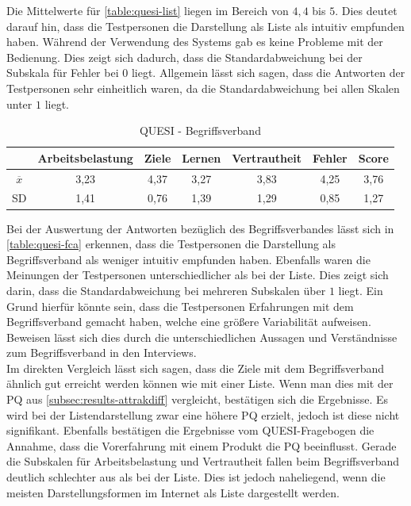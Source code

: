 Die Mittelwerte für \autoref{table:quesi-list} liegen im Bereich von $4,4$ bis $5$.
Dies deutet darauf hin, dass die Testpersonen die Darstellung als Liste als intuitiv empfunden haben.
Während der Verwendung des Systems gab es keine Probleme mit der Bedienung.
Dies zeigt sich dadurch, dass die Standardabweichung bei der Subskala für Fehler bei $0$ liegt.
Allgemein lässt sich sagen, dass die Antworten der Testpersonen sehr einheitlich waren, da die Standardabweichung bei allen Skalen unter $1$ liegt.

\begin{center}
    \begin{table}[!ht]
        \centering
        \begin{tabular}{|l|c|c|c|c|c|c|}
            \hline
                                                 & Arbeitsbelastung & Ziele & Lernen & Vertrautheit & Fehler & Score \\ \hline \hline
            \multicolumn{1}{|c|}{$\overline{x}$} & 3,23             & 4,37  & 3,27   & 3,83         & 4,25   & 3,76  \\ \hline
            \multicolumn{1}{|c|}{SD}             & 1,41             & 0,76  & 1,39   & 1,29         & 0,85   & 1,27  \\ \hline
        \end{tabular}
        \caption{QUESI - Begriffsverband}
        \label{table:quesi-fca}
    \end{table}
\end{center}

Bei der Auswertung der Antworten bezüglich des Begriffsverbandes lässt sich in \autoref{table:quesi-fca} erkennen, dass die Testpersonen die Darstellung als Begriffsverband als weniger intuitiv empfunden haben.
Ebenfalls waren die Meinungen der Testpersonen unterschiedlicher als bei der Liste.
Dies zeigt sich darin, dass die Standardabweichung bei mehreren Subskalen über $1$ liegt.
Ein Grund hierfür könnte sein, dass die Testpersonen Erfahrungen mit dem Begriffsverband gemacht haben, welche eine größere Variabilität aufweisen.
Beweisen lässt sich dies durch die unterschiedlichen Aussagen und Verständnisse zum Begriffsverband in den Interviews.\\

Im direkten Vergleich lässt sich sagen, dass die Ziele mit dem Begriffsverband ähnlich gut erreicht werden können wie mit einer Liste.
Wenn man dies mit der \ac{PQ} aus \autoref{subsec:results-attrakdiff} vergleicht, bestätigen sich die Ergebnisse.
Es wird bei der Listendarstellung zwar eine höhere \ac{PQ} erzielt, jedoch ist diese nicht signifikant.
Ebenfalls bestätigen die Ergebnisse vom \ac{QUESI}-Fragebogen die Annahme, dass die Vorerfahrung mit einem Produkt die \ac{PQ} beeinflusst.
Gerade die Subskalen für Arbeitsbelastung und Vertrautheit fallen beim Begriffsverband deutlich schlechter aus als bei der Liste.
Dies ist jedoch naheliegend, wenn die meisten Darstellungsformen im Internet als Liste dargestellt werden.\\

